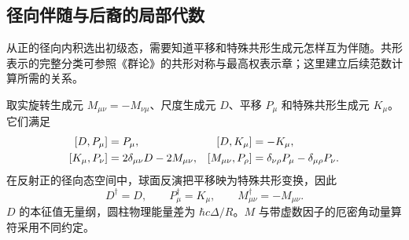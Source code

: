 \subsection{径向伴随与后裔的局部代数}

从正的径向内积选出初级态，需要知道平移和特殊共形生成元怎样互为伴随。共形表示的完整分类可参照《群论》的共形对称与最高权表示章；这里建立后续范数计算所需的关系。

\begin{definition}[径向共形生成元]
取实旋转生成元 $M_{\mu\nu}=-M_{\nu\mu}$、尺度生成元 $D$、平移 $P_\mu$ 和特殊共形生成元 $K_\mu$。它们满足
\begin{align}\label{eq:ghs-conformal-commutators}
 [D,P_\mu]&=P_\mu,&[D,K_\mu]&=-K_\mu,\\
 [K_\mu,P_\nu]&=2\delta_{\mu\nu}D-2M_{\mu\nu},&
 [M_{\mu\nu},P_\rho]&=\delta_{\nu\rho}P_\mu-\delta_{\mu\rho}P_\nu.\notag
\end{align}
在反射正的径向态空间中，球面反演把平移映为特殊共形变换，因此
\begin{equation}\label{eq:ghs-radial-generator-adjoint}
 D^\dagger=D,\qquad P_\mu^\dagger=K_\mu,\qquad M_{\mu\nu}^\dagger=-M_{\mu\nu}.
\end{equation}
$D$ 的本征值无量纲，圆柱物理能量差为 $\hbar c\Delta/R$。$M$ 与带虚数因子的厄密角动量算符采用不同约定。
\end{definition}


